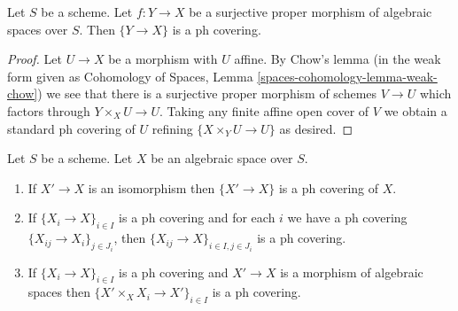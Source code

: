 \begin{lemma}
\label{lemma-surjective-proper-ph}
Let $S$ be a scheme. Let $f : Y \to X$ be a surjective proper morphism
of algebraic spaces over $S$. Then $\{Y \to X\}$ is a ph covering.
\end{lemma}

\begin{proof}
Let $U \to X$ be a morphism with $U$ affine.
By Chow's lemma (in the weak form given as
Cohomology of Spaces, Lemma \ref{spaces-cohomology-lemma-weak-chow})
we see that there is a surjective proper morphism of schemes
$V \to U$ which factors through $Y \times_X U \to U$.
Taking any finite affine open cover of $V$ we obtain a
standard ph covering of $U$ refining $\{X \times_Y U \to U\}$
as desired.
\end{proof}

\begin{lemma}
\label{lemma-ph}
Let $S$ be a scheme. Let $X$ be an algebraic space over $S$.
\begin{enumerate}
\item If $X' \to X$ is an isomorphism then $\{X' \to X\}$
is a ph covering of $X$.
\item If $\{X_i \to X\}_{i\in I}$ is a ph covering and for each
$i$ we have a ph covering $\{X_{ij} \to X_i\}_{j\in J_i}$, then
$\{X_{ij} \to X\}_{i \in I, j\in J_i}$ is a ph covering.
\item If $\{X_i \to X\}_{i\in I}$ is a ph covering
and $X' \to X$ is a morphism of algebraic spaces then
$\{X' \times_X X_i \to X'\}_{i\in I}$ is a ph covering.
\end{enumerate}
\end{lemma}

